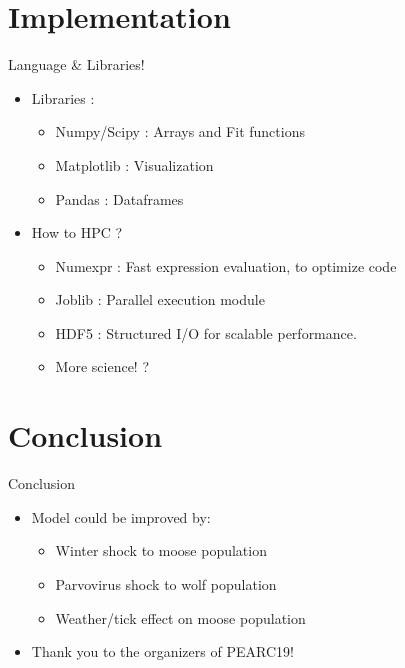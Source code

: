 \documentclass{beamer}
\begin{document}
\section{Implementation}
\begin{frame}{Language \& Libraries!}
	\begin{itemize}
		\item Libraries : 
		   \begin{itemize}
			\item Numpy/Scipy : Arrays and Fit functions
			\item Matplotlib : Visualization
			\item Pandas  : Dataframes
			\end{itemize}
		\item How to HPC ?
		   \begin{itemize}
			\item Numexpr : Fast expression evaluation, to optimize code
			\item Joblib : Parallel execution module
			\item HDF5 : Structured I/O for scalable performance.
			\item More science! ?
			\end{itemize}
	\end{itemize}
\end{frame}


\section{Conclusion}
\begin{frame}{Conclusion}
	\begin{itemize}
		\item Model could be improved by: 
		\begin{itemize}
			\item Winter shock to moose population
			\item Parvovirus shock to wolf population
			\item Weather/tick effect on moose population
		\end{itemize}
		\item Thank you to the organizers of PEARC19! 
	\end{itemize}
\end{frame}


%
%
\end{document}
